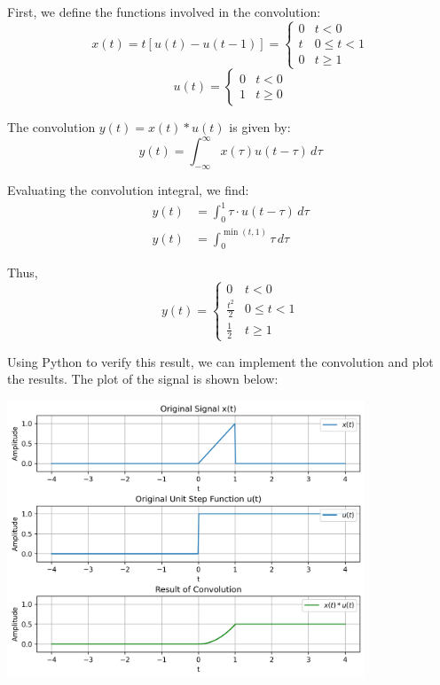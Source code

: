 \documentclass[a4paper, 10pt]{article}
\begin{document}
\begin{solution}
First, we define the functions involved in the convolution:
\[ x(t) = t[u(t) - u(t-1)] = \begin{cases} 0 & t < 0 \\ t & 0 \leq t < 1 \\ 0 & t \geq 1 \end{cases} \]
\[ u(t) = \begin{cases} 0 & t < 0 \\ 1 & t \geq 0 \end{cases} \]

The convolution \( y(t) = x(t) * u(t) \) is given by:
\[ y(t) = \int_{-\infty}^{\infty} x(\tau) u(t - \tau) \, d\tau \]

Evaluating the convolution integral, we find:
\begin{align*}
    y(t) &= \int_{0}^{1} \tau \cdot u(t - \tau) \, d\tau \\
    y(t) &= \int_{0}^{\min(t, 1)} \tau \, d\tau
\end{align*}

Thus,
\[ \boxed{
y(t) = \begin{cases} 
    0 & t < 0 \\
    \frac{t^2}{2} & 0 \leq t < 1 \\
    \frac{1}{2} & t \geq 1
\end{cases}
} \]

Using Python to verify this result, we can implement the convolution and plot the results.
The plot of the signal is shown below:
\begin{center}
    \includegraphics[width=0.8\textwidth]{images/problem_1_3.png}
\end{center}
\end{solution}
\end{document}
